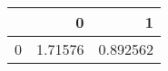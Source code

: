 \begin{tabular}{lrr}
\toprule
{} &        0 &         1 \\
\midrule
0 &  1.71576 &  0.892562 \\
\bottomrule
\end{tabular}
